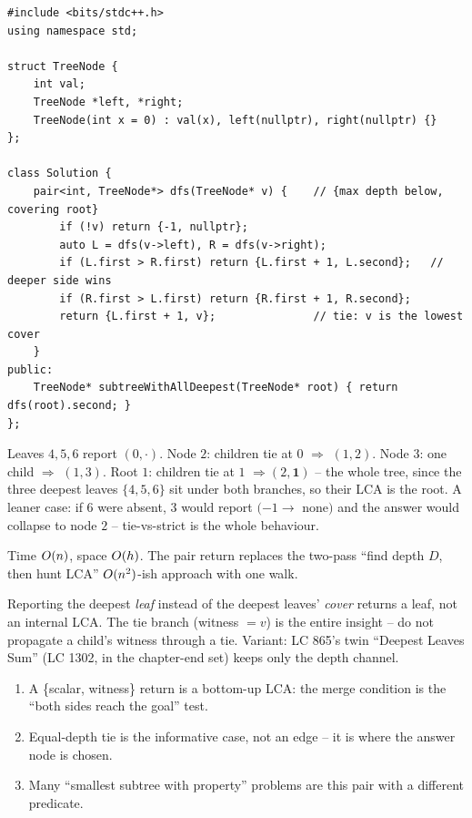 \begin{lstlisting}[caption={Smallest Deepest Subtree (LeetCode 865)}, label={lst:c02-deepest}]
#include <bits/stdc++.h>
using namespace std;

struct TreeNode {
    int val;
    TreeNode *left, *right;
    TreeNode(int x = 0) : val(x), left(nullptr), right(nullptr) {}
};

class Solution {
    pair<int, TreeNode*> dfs(TreeNode* v) {    // {max depth below, covering root}
        if (!v) return {-1, nullptr};
        auto L = dfs(v->left), R = dfs(v->right);
        if (L.first > R.first) return {L.first + 1, L.second};   // deeper side wins
        if (R.first > L.first) return {R.first + 1, R.second};
        return {L.first + 1, v};               // tie: v is the lowest cover
    }
public:
    TreeNode* subtreeWithAllDeepest(TreeNode* root) { return dfs(root).second; }
};
\end{lstlisting}

\begin{tracebox}[On $R$]
Leaves $4,5,6$ report $(0,\cdot)$. Node $2$: children tie at $0$ $\Rightarrow$
$(1,2)$. Node $3$: one child $\Rightarrow$ $(1,3)$. Root $1$: children tie at $1$
$\Rightarrow (2,\mathbf{1})$ -- the whole tree, since the three deepest leaves
$\{4,5,6\}$ sit under both branches, so their LCA is the root. A leaner case: if
$6$ were absent, $3$ would report $(-1\to$ none$)$ and the answer would collapse
to node $2$ -- tie-vs-strict is the whole behaviour.
\end{tracebox}

\begin{complexitybox}
Time $O(n)$, space $O(h)$. The pair return replaces the two-pass
``find depth $D$, then hunt LCA'' $O(n^2)$-ish approach with one walk.
\end{complexitybox}

\begin{warningbox}
Reporting the deepest \emph{leaf} instead of the deepest leaves' \emph{cover}
returns a leaf, not an internal LCA. The tie branch (witness $=v$) is the entire
insight -- do not propagate a child's witness through a tie. Variant: LC 865's
twin ``Deepest Leaves Sum'' (LC 1302, in the chapter-end set) keeps
only the depth channel.
\end{warningbox}

\begin{insightbox}
\begin{enumerate}[nosep, leftmargin=1.6em]
  \item A \{scalar, witness\} return is a bottom-up LCA: the merge condition is
        the ``both sides reach the goal'' test.
  \item Equal-depth tie is the informative case, not an edge -- it is where the
        answer node is chosen.
  \item Many ``smallest subtree with property'' problems are this pair with a
        different predicate.
\end{enumerate}
\end{insightbox}

